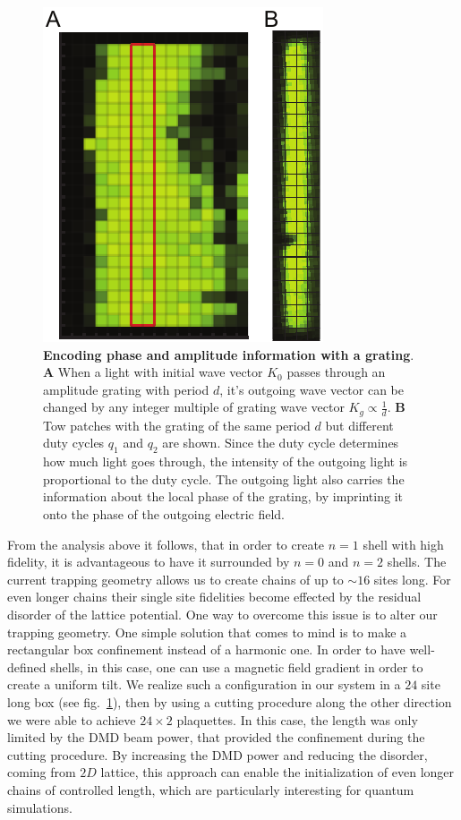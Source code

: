 \begin{figure}[t]
	\centering
	\includegraphics[scale=1]{figures/CTE_MI_box.pdf}
	\caption{{\bf Encoding phase and amplitude information with a grating}. {\bf A} When a light with initial wave vector $K_0$ passes through an amplitude grating with period $d$, it's outgoing wave vector can be changed by any integer multiple of grating wave vector $K_g\propto \frac{1}{d}$. {\bf B} Tow patches with the grating of the same period $d$ but different duty cycles $q_1$ and $q_2$ are shown. Since the duty cycle determines how much light goes through, the intensity of the outgoing light is proportional to the duty cycle. The outgoing light also carries the information about the local phase of the grating, by imprinting it onto the phase of the outgoing electric field.}
	\label{fig:CTE_MI_box}
\end{figure}

From the analysis above it follows, that in order to create $n=1$ shell with high fidelity, it is advantageous to have it surrounded by $n=0$ and $n=2$ shells. The current trapping geometry allows us to create chains of up to $\sim 16$ sites long. For even longer chains their single site fidelities become effected by the residual disorder of the lattice potential. One way to overcome this issue is to alter our trapping geometry. One simple solution that comes to mind is to make a rectangular box confinement instead of a harmonic one. In order to have well-defined shells, in this case, one can use a magnetic field gradient in order to create a uniform tilt. We realize such a configuration in our system in a $24$ site long box (see fig.~\ref{fig:CTE_MI_box}), then by using a cutting procedure along the other direction we were able to achieve $24\times 2$ plaquettes. In this case, the length was only limited by the DMD beam power, that provided the confinement during the cutting procedure. By increasing the DMD power and reducing the disorder, coming from $2D$ lattice, this approach can enable the initialization of even longer chains of controlled length, which are particularly interesting for quantum simulations.

